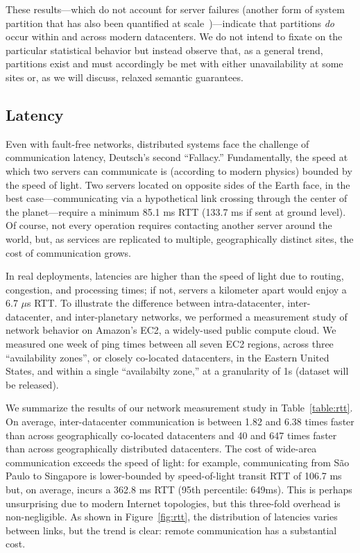 These results---which do not account for server failures (another form
of system partition that has also been quantified at
scale~\cite{google-availability})---indicate that partitions
\textit{do} occur within and across modern datacenters. We do not
intend to fixate on the particular statistical behavior but instead
observe that, as a general trend, partitions exist and must
accordingly be met with either unavailability at some sites or, as we
will discuss, relaxed semantic guarantees.

\subsection{Latency}

Even with fault-free networks, distributed systems face the challenge
of communication latency, Deutsch's second ``Fallacy.'' Fundamentally,
the speed at which two servers can communicate is (according to modern
physics) bounded by the speed of light. Two servers located on
opposite sides of the Earth face, in the best case---communicating via
a hypothetical link crossing through the center of the
planet---require a minimum 85.1 ms RTT (133.7 ms if sent at ground
level). Of course, not every operation requires contacting another
server around the world, but, as services are replicated to multiple,
geographically distinct sites, the cost of communication grows.

In real deployments, latencies are higher than the speed of light due
to routing, congestion, and processing times; if not, servers a
kilometer apart would enjoy a 6.7 $\mu$s RTT. To illustrate the
difference between intra-datacenter, inter-datacenter, and
inter-planetary networks, we performed a measurement study of network
behavior on Amazon's EC2, a widely-used public compute cloud. We
measured one week of ping times between all seven EC2 regions, across
three ``availability zones'', or closely co-located datacenters, in
the Eastern United States, and within a single ``availabilty zone,''
at a granularity of 1s (dataset will be released).

We summarize the results of our network measurement study in
Table~\ref{table:rtt}. On average, inter-datacenter communication is
between 1.82 and 6.38 times faster than across geographically
co-located datacenters and 40 and 647 times faster than across
geographically distributed datacenters. The cost of wide-area
communication exceeds the speed of light: for example, communicating
from S\~{a}o Paulo to Singapore is lower-bounded by speed-of-light
transit RTT of 106.7 ms but, on average, incurs a 362.8 ms RTT (95th
percentile: 649ms). This is perhaps unsurprising due to modern
Internet topologies, but this three-fold overhead is
non-negligible. As shown in Figure~\ref{fig:rtt}, the distribution of
latencies varies between links, but the trend is clear: remote
communication has a substantial cost.

